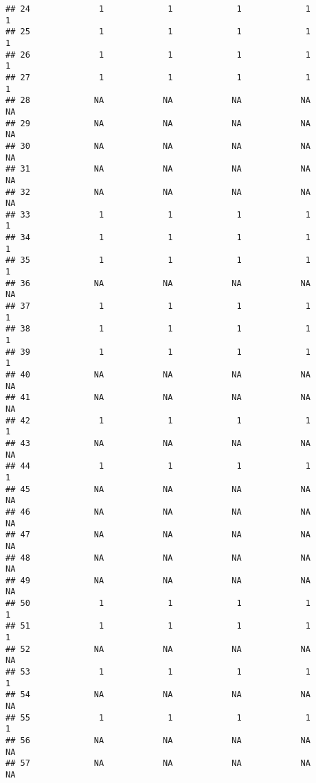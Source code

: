 \documentclass[
]{article}
\begin{document}
\begin{verbatim}
## 24              1             1             1             1             1
## 25              1             1             1             1             1
## 26              1             1             1             1             1
## 27              1             1             1             1             1
## 28             NA            NA            NA            NA            NA
## 29             NA            NA            NA            NA            NA
## 30             NA            NA            NA            NA            NA
## 31             NA            NA            NA            NA            NA
## 32             NA            NA            NA            NA            NA
## 33              1             1             1             1             1
## 34              1             1             1             1             1
## 35              1             1             1             1             1
## 36             NA            NA            NA            NA            NA
## 37              1             1             1             1             1
## 38              1             1             1             1             1
## 39              1             1             1             1             1
## 40             NA            NA            NA            NA            NA
## 41             NA            NA            NA            NA            NA
## 42              1             1             1             1             1
## 43             NA            NA            NA            NA            NA
## 44              1             1             1             1             1
## 45             NA            NA            NA            NA            NA
## 46             NA            NA            NA            NA            NA
## 47             NA            NA            NA            NA            NA
## 48             NA            NA            NA            NA            NA
## 49             NA            NA            NA            NA            NA
## 50              1             1             1             1             1
## 51              1             1             1             1             1
## 52             NA            NA            NA            NA            NA
## 53              1             1             1             1             1
## 54             NA            NA            NA            NA            NA
## 55              1             1             1             1             1
## 56             NA            NA            NA            NA            NA
## 57             NA            NA            NA            NA            NA

\end{verbatim}
\end{document}
